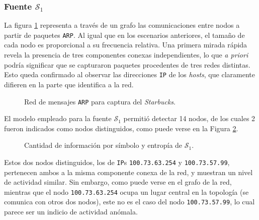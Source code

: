 \subsubsection{Fuente $\mathcal{S}_1$}

La figura \ref{res:esc3:graph} representa a través de un grafo las
comunicaciones entre nodos a partir de paquetes \texttt{ARP}. Al igual que
en los escenarios anteriores, el tamaño de cada nodo es proporcional a su
frecuencia relativa. Una primera mirada rápida revela la presencia de tres
componentes conexas independientes, lo que \emph{a priori} podría significar
que se capturaron paquetes procedentes de tres redes distintas. Esto queda
confirmado al observar las direcciones \texttt{IP} de los \emph{hosts}, que
claramente difieren en la parte que identifica a la red.

\begin{figure}[H]
    \caption{Red de mensajes \texttt{ARP} para captura del \emph{Starbucks}.}
    \label{res:esc3:graph}
\end{figure}

El modelo empleado para la fuente $\mathcal{S}_1$ permitió detectar 14 nodos,
de los cuales 2 fueron indicados como nodos distinguidos, como puede verse
en la Figura \ref{res:esc3:s1}.

\begin{figure}[H]
    \caption{Cantidad de información por símbolo y entropía de $\mathcal{S}_1$.}
    \label{res:esc3:s1}
\end{figure}

Estos dos nodos distinguidos, los de \texttt{IP}s \texttt{100.73.63.254} y
\texttt{100.73.57.99}, pertenecen ambos a la misma componente conexa de la
red, y muestran un nivel de actividad similar. Sin embargo, como puede verse
en el grafo de la red, mientras que el nodo \texttt{100.73.63.254} ocupa
un lugar central en la topología (se comunica con otros dos nodos), este no
es el caso del nodo \texttt{100.73.57.99}, lo cual parece ser un indicio de
actividad anómala.

